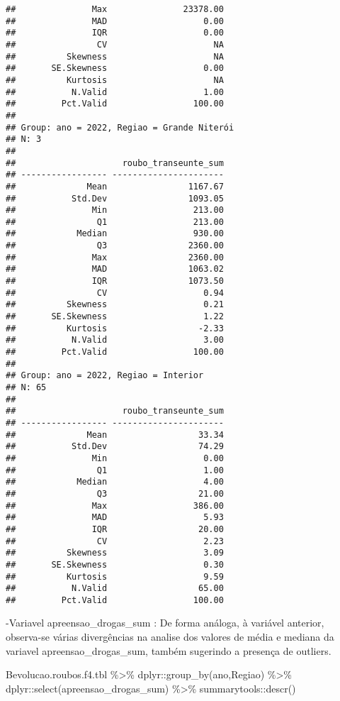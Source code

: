 \documentclass[
]{article}
\newenvironment{Shaded}{\begin{snugshade}}{\end{snugshade}}
\newcommand{\FunctionTok}[1]{\textcolor[rgb]{0.00,0.00,0.00}{#1}}
\newcommand{\NormalTok}[1]{#1}
\newcommand{\SpecialCharTok}[1]{\textcolor[rgb]{0.00,0.00,0.00}{#1}}
\begin{document}
\begin{verbatim}
##               Max               23378.00
##               MAD                   0.00
##               IQR                   0.00
##                CV                     NA
##          Skewness                     NA
##       SE.Skewness                   0.00
##          Kurtosis                     NA
##           N.Valid                   1.00
##         Pct.Valid                 100.00
## 
## Group: ano = 2022, Regiao = Grande Niterói  
## N: 3  
## 
##                     roubo_transeunte_sum
## ----------------- ----------------------
##              Mean                1167.67
##           Std.Dev                1093.05
##               Min                 213.00
##                Q1                 213.00
##            Median                 930.00
##                Q3                2360.00
##               Max                2360.00
##               MAD                1063.02
##               IQR                1073.50
##                CV                   0.94
##          Skewness                   0.21
##       SE.Skewness                   1.22
##          Kurtosis                  -2.33
##           N.Valid                   3.00
##         Pct.Valid                 100.00
## 
## Group: ano = 2022, Regiao = Interior  
## N: 65  
## 
##                     roubo_transeunte_sum
## ----------------- ----------------------
##              Mean                  33.34
##           Std.Dev                  74.29
##               Min                   0.00
##                Q1                   1.00
##            Median                   4.00
##                Q3                  21.00
##               Max                 386.00
##               MAD                   5.93
##               IQR                  20.00
##                CV                   2.23
##          Skewness                   3.09
##       SE.Skewness                   0.30
##          Kurtosis                   9.59
##           N.Valid                  65.00
##         Pct.Valid                 100.00
\end{verbatim}

-Variavel apreensao\_drogas\_sum : De forma análoga, à variável anterior, observa-se várias divergências na analise dos valores de média e mediana da variavel apreensao\_drogas\_sum, também sugerindo a presença de outliers.

\begin{Shaded}
\begin{Highlighting}[]
\NormalTok{Bevolucao.roubos.f4.tbl }\SpecialCharTok{\%\textgreater{}\%}\NormalTok{ dplyr}\SpecialCharTok{::}\FunctionTok{group\_by}\NormalTok{(ano,Regiao) }\SpecialCharTok{\%\textgreater{}\%}\NormalTok{ dplyr}\SpecialCharTok{::}\FunctionTok{select}\NormalTok{(apreensao\_drogas\_sum) }\SpecialCharTok{\%\textgreater{}\%}\NormalTok{ summarytools}\SpecialCharTok{::}\FunctionTok{descr}\NormalTok{()}
\end{Highlighting}
\end{Shaded}
\end{document}
